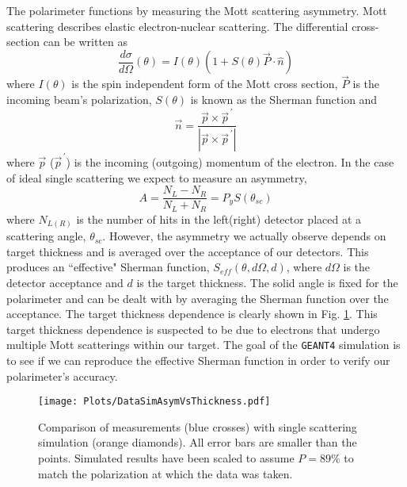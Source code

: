\documentclass[11pt]{article}
\begin{document}
The polarimeter functions by measuring the Mott scattering asymmetry. Mott scattering describes elastic electron-nuclear scattering. The differential cross-section can be written as
\begin{equation}
 \frac{d\sigma}{d\Omega}(\theta) = I(\theta)\left(1 + S(\theta)\vec{P}\cdot\hat{n}\right)
\end{equation}
where $I(\theta)$ is the spin independent form of the Mott cross section, $\vec{P}$ is the incoming beam's polarization, $S(\theta)$ is known as the Sherman function and 
\begin{equation}
 \vec{n} = \frac{\vec{p}\times\vec{p}^{\,\prime}}{\left|\vec{p}\times\vec{p}^{\,\prime}\right|}
\end{equation}
where $\vec{p}$ ($\vec{p}^{\,\prime}$) is the incoming (outgoing) momentum of the electron. In the case of ideal single scattering we expect to measure an asymmetry,
\begin{equation}
 \label{eq:SimpleAsym}
 A = \frac{N_L-N_R}{N_L+N_R} = P_yS(\theta_{sc})
\end{equation}
where $N_{L(R)}$ is the number of hits in the left(right) detector placed at a scattering angle, $\theta_{sc}$. However, the asymmetry we actually observe depends on target thickness and is averaged over the acceptance of our detectors. This produces an ``effective" Sherman function, $S_{eff}(\theta,d\Omega,d)$, where $d\Omega$ is the detector acceptance and $d$ is the target thickness. The solid angle is fixed for the polarimeter and can be dealt with by averaging the Sherman function over the acceptance. The target thickness dependence is clearly shown in Fig. \ref{fig:DataVsSingleSim}. This target thickness dependence is suspected to be due to electrons that undergo multiple Mott scatterings within our target. The goal of the \texttt{GEANT4} simulation is to see if we can reproduce the effective Sherman function in order to verify our polarimeter's accuracy.   

\begin{figure}[!h]
 \centering
 \texttt{[image: Plots/DataSimAsymVsThickness.pdf]}
 \caption{Comparison of measurements (blue crosses) with single scattering simulation (orange diamonds). All error bars are smaller than the points. Simulated results have been scaled to assume $P = 89\%$ to match the polarization at which the data was taken.} 
\label{fig:DataVsSingleSim}
\end{figure}
\end{document}
